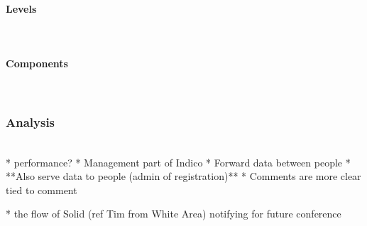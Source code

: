 \paragraph{Levels}\mbox{}\\
\paragraph{Components}\mbox{}\\

\subsubsection{Analysis}\mbox{}\\

* performance?
* Management part of Indico
  * Forward data between people
  * **Also serve data to people (admin of registration)**
* Comments are more clear tied to comment

* the flow of Solid (ref Tim from White Area) notifying for future conference
